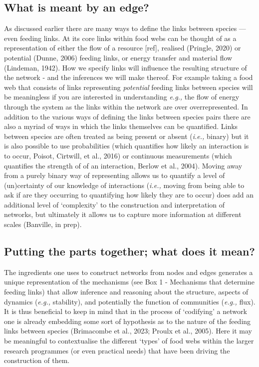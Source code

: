 \documentclass[
]{article}
\begin{document}
\subsection{What is meant by an edge?}\label{what-is-meant-by-an-edge}

As discussed earlier there are many ways to define the links between
species --- even feeding links. At its core links within food webs can
be thought of as a representation of either the flow of a resource
{[}ref{]}, realised (Pringle, 2020) or potential (Dunne, 2006) feeding
links, or energy transfer and material flow (Lindeman, 1942). How we
specify links will influence the resulting structure of the network -
and the inferences we will make thereof. For example taking a food web
that consists of links representing \emph{potential} feeding links
between species will be meaningless if you are interested in
understanding \emph{e.g.,} the flow of energy through the system as the
links within the network are over overrepresented. In addition to the
various ways of defining the links between species pairs there are also
a myriad of ways in which the links themselves can be quantified. Links
between species are often treated as being present or absent
(\emph{i.e.,} binary) but it is also possible to use probabilities
(which quantifies how likely an interaction is to occur, Poisot,
Cirtwill, et al., 2016) or continuous measurements (which quantifies the
strength of of an interaction, Berlow et al., 2004). Moving away from a
purely binary way of representing allows us to quantify a level of
(un)certainty of our knowledge of interactions (\emph{i.e.,} moving from
being able to ask if are they occurring to quantifying how likely they
are to occur) does add an additional level of `complexity' to the
construction and interpretation of networks, but ultimately it allows us
to capture more information at different scales (Banville, in prep).

\subsection{Putting the parts together; what does it
mean?}\label{putting-the-parts-together-what-does-it-mean}

The ingredients one uses to construct networks from nodes and edges
generates a unique representation of the mechanisms (see Box 1 -
Mechanisms that determine feeding links) that allow inference and
reasoning about the structure, aspects of dynamics (\emph{e.g.,}
stability), and potentially the function of communities (\emph{e.g.,}
flux). It is thus beneficial to keep in mind that in the process of
`codifying' a network one is already embedding some sort of hypothesis
as to the nature of the feeding links between species (Brimacombe et
al., 2023; Proulx et al., 2005). Here it may be meaningful to
contextualise the different `types' of food webs within the larger
research programmes (or even practical needs) that have been driving the
construction of them.
\end{document}
